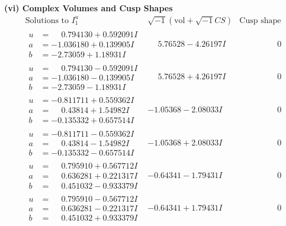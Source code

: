 \documentclass[1p]{elsarticle_modified}
\theoremstyle{definition}
\newcommand{\I}{\sqrt{-1}}
\begin{document}
\newpage\flushleft \textbf{(vi) Complex Volumes and Cusp Shapes}
$$\begin{array}{c|c|c}  
\text{Solutions to }I^u_{1}& \I (\text{vol} + \sqrt{-1}CS) & \text{Cusp shape}\\
 \hline 
\begin{aligned}
u &= \phantom{-}0.794130 + 0.592091 I \\
a &= -1.036180 + 0.139905 I \\
b &= -2.73059 + 1.18931 I\end{aligned}
 & \phantom{-}5.76528 - 4.26197 I & \phantom{-0.000000 } 0 \\ \hline\begin{aligned}
u &= \phantom{-}0.794130 - 0.592091 I \\
a &= -1.036180 - 0.139905 I \\
b &= -2.73059 - 1.18931 I\end{aligned}
 & \phantom{-}5.76528 + 4.26197 I & \phantom{-0.000000 } 0 \\ \hline\begin{aligned}
u &= -0.811711 + 0.559362 I \\
a &= \phantom{-}0.43814 + 1.54982 I \\
b &= -0.135332 + 0.657514 I\end{aligned}
 & -1.05368 - 2.08033 I & \phantom{-0.000000 } 0 \\ \hline\begin{aligned}
u &= -0.811711 - 0.559362 I \\
a &= \phantom{-}0.43814 - 1.54982 I \\
b &= -0.135332 - 0.657514 I\end{aligned}
 & -1.05368 + 2.08033 I & \phantom{-0.000000 } 0 \\ \hline\begin{aligned}
u &= \phantom{-}0.795910 + 0.567712 I \\
a &= \phantom{-}0.636281 + 0.221317 I \\
b &= \phantom{-}0.451032 - 0.933379 I\end{aligned}
 & -0.64341 - 1.79431 I & \phantom{-0.000000 } 0 \\ \hline\begin{aligned}
u &= \phantom{-}0.795910 - 0.567712 I \\
a &= \phantom{-}0.636281 - 0.221317 I \\
b &= \phantom{-}0.451032 + 0.933379 I\end{aligned}
 & -0.64341 + 1.79431 I & \phantom{-0.000000 } 0 \\ \hline\begin{aligned}

\end{aligned}
\end{array}$$
\end{document}

